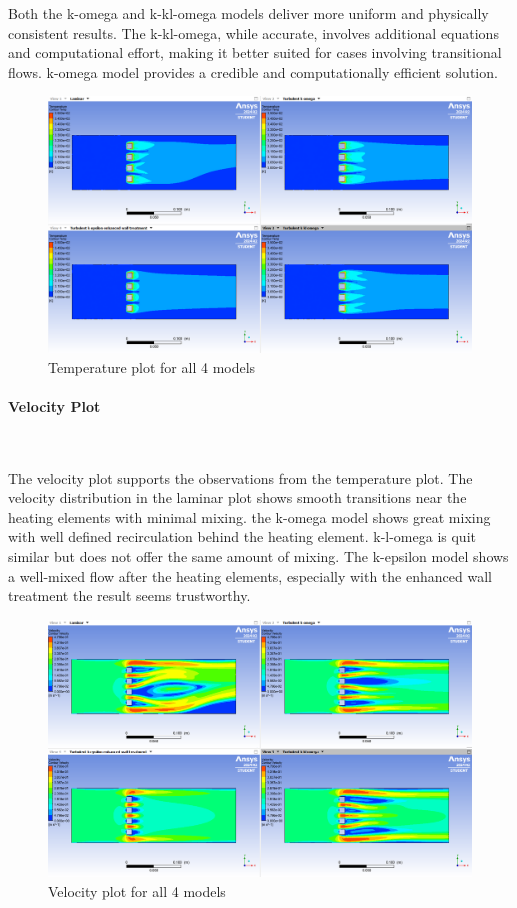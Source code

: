 Both the k-omega and k-kl-omega models deliver more uniform and physically consistent results. The k-kl-omega, while accurate, involves additional equations and computational effort, making it better suited for cases involving transitional flows. k-omega model provides a credible and computationally efficient solution.

\begin{figure}[htbp]   
    \centering
    \includegraphics[width=1\textwidth]{img/Temp_plot_comparison.png}
    \caption{Temperature plot for all 4 models}
    \label{fig:temp_plot}
\end{figure}

\paragraph{Velocity Plot}~

The velocity plot supports the observations from the temperature plot.
The velocity distribution in the laminar plot shows smooth transitions near the heating elements with minimal mixing. the k-omega model shows great mixing with well defined recirculation behind the heating element. k-l-omega is quit similar but does not offer the same amount of mixing.
The k-epsilon model shows a well-mixed flow after the heating elements, especially with the enhanced wall treatment the result seems trustworthy.


\begin{figure}[htbp]   
    \centering
    \includegraphics[width=1\textwidth]{img/Velocity_plot_comparison.png}
    \caption{Velocity plot for all 4 models}
    \label{fig:velocity_plot}
\end{figure}

